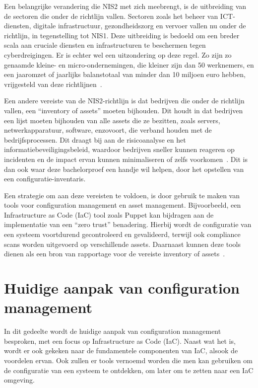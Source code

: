 Een belangrijke verandering die NIS2 met zich meebrengt, is de uitbreiding van de sectoren die onder de richtlijn vallen.
Sectoren zoals het beheer van ICT-diensten, digitale infrastructuur, gezondheidszorg en vervoer vallen nu onder de richtlijn, in tegenstelling tot NIS1.
Deze uitbreiding is bedoeld om een breder scala aan cruciale diensten en infrastructuren te beschermen tegen cyberdreigingen.
Er is echter wel een uitzondering op deze regel.
Zo zijn zo genaamde kleine- en micro-ondernemingen, die kleiner zijn dan 50 werknemers, en een jaaromzet of jaarlijks balanstotaal van minder dan 10 miljoen euro hebben, vrijgesteld van deze richtlijnen~\autocite{nis2-eu-be}.

Een andere vereiste van de NIS2-richtlijn is dat bedrijven die onder de richtlijn vallen, een ``inventory of assets'' moeten bijhouden.
Dit houdt in dat bedrijven een lijst moeten bijhouden van alle assets die ze bezitten, zoals servers, netwerkapparatuur, software, enzovoort, die verband houden met de bedrijfsprocessen.
Dit draagt bij aan de risicoanalyse en het informatiebeveiligingsbeleid, waardoor bedrijven sneller kunnen reageren op incidenten en de impact ervan kunnen minimaliseren of zelfs voorkomen~\autocite{dragos-nis2}.
Dit is dan ook waar deze bachelorproef een handje wil helpen, door het opstellen van een configuratie-inventaris.

Een strategie om aan deze vereisten te voldoen, is door gebruik te maken van tools voor configuration management en asset management.
Bijvoorbeeld, een Infrastructure as Code (IaC) tool zoals Puppet kan bijdragen aan de implementatie van een ``zero trust'' benadering.
Hierbij wordt de configuratie van een systeem voortdurend gecontroleerd en gevalideerd, terwijl ook compliance scans worden uitgevoerd op verschillende assets. Daarnaast kunnen deze tools dienen als een bron van rapportage voor de vereiste inventory of assets~\autocite{puppet-nis2}.


\section{Huidige aanpak van configuration management}%
\label{sec:huidige-aanpak-van-configuration-management}

In dit gedeelte wordt de huidige aanpak van configuration management besproken, met een focus op Infrastructure as Code (IaC).
Naast wat het is, wordt er ook gekeken naar de fundamentele componenten van IaC, alsook de voordelen ervan.
Ook zullen er tools vernoemd worden die men kan gebruiken om de configuratie van een systeem te ontdekken, om later om te zetten naar een IaC omgeving.

